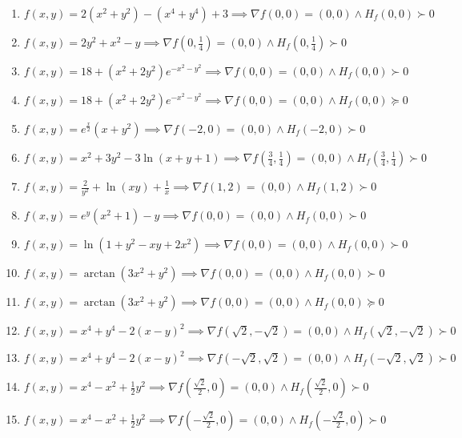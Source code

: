 \documentclass[11pt,a4paper]{article}
\begin{document}
\begin{enumerate}
\item $\displaystyle f(x, y) = 2(x^{2} + y^{2}) - (x^{4} + y^{4}) + 3 \implies \nabla f(0, 0) = (0, 0) \land H_{f}(0, 0) \succ 0$
\item $\displaystyle f(x, y) = 2y^{2} + x^{2} - y \implies \nabla f\left( 0, \frac{1}{4} \right) = (0, 0) \land H_{f}\left( 0, \frac{1}{4} \right) \succ 0$
\item $\displaystyle f(x, y) = 18 + (x^{2} + 2y^{2}) e^{-x^{2} - y^{2}} \implies \nabla f(0, 0) = (0, 0) \land H_{f}(0, 0) \succ 0$
\item $\displaystyle f(x, y) = 18 + (x^{2} + 2y^{2}) e^{-x^{2} - y^{2}} \implies \nabla f(0, 0) = (0, 0) \land H_{f}(0, 0) \succeq 0$
\item $\displaystyle f(x, y) = e^{\frac{x}{2}} (x + y^{2}) \implies \nabla f(-2, 0) = (0, 0) \land H_{f}(-2, 0) \succ 0$
\item $\displaystyle f(x, y) = x^{2} + 3y^{2} - 3\ln(x + y + 1) \implies \nabla f\left( \frac{3}{4}, \frac{1}{4} \right) = (0, 0) \land H_{f}\left( \frac{3}{4}, \frac{1}{4} \right) \succ 0$
\item $\displaystyle f(x, y) = \frac{2}{y^{2}} + \ln(xy) + \frac{1}{x} \implies \nabla f(1, 2) = (0, 0) \land H_{f}(1, 2) \succ 0$
\item $\displaystyle f(x, y) = e^{y} (x^{2} + 1) - y \implies \nabla f(0, 0) = (0, 0) \land H_{f}(0, 0) \succ 0$
\item $\displaystyle f(x, y) = \ln(1 + y^{2} - xy + 2x^{2}) \implies \nabla f(0, 0) = (0, 0) \land H_{f}(0, 0) \succ 0$
\item $\displaystyle f(x, y) = \arctan(3x^{2} + y^{2}) \implies \nabla f(0, 0) = (0, 0) \land H_{f}(0, 0) \succ 0$
\item $\displaystyle f(x, y) = \arctan(3x^{2} + y^{2}) \implies \nabla f(0, 0) = (0, 0) \land H_{f}(0, 0) \succeq 0$
\item $\displaystyle f(x, y) = x^{4} + y^{4} - 2(x - y)^{2} \implies \nabla f\left( \sqrt{2}, -\sqrt{2} \right) = (0, 0) \land H_{f}\left( \sqrt{2}, -\sqrt{2} \right) \succ 0$
\item $\displaystyle f(x, y) = x^{4} + y^{4} - 2(x - y)^{2} \implies \nabla f\left( -\sqrt{2}, \sqrt{2} \right) = (0, 0) \land H_{f}\left( -\sqrt{2}, \sqrt{2} \right) \succ 0$
\item $\displaystyle f(x, y) = x^{4} - x^{2} + \frac{1}{2} y^{2} \implies \nabla f\left( \frac{\sqrt{2}}{2}, 0 \right) = (0, 0) \land H_{f}\left( \frac{\sqrt{2}}{2}, 0 \right) \succ 0$
\item $\displaystyle f(x, y) = x^{4} - x^{2} + \frac{1}{2} y^{2} \implies \nabla f\left( -\frac{\sqrt{2}}{2}, 0 \right) = (0, 0) \land H_{f}\left( -\frac{\sqrt{2}}{2}, 0 \right) \succ 0$

\end{enumerate}
\end{document}
